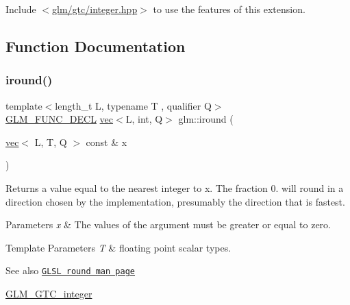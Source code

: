 Include $<$\mbox{\hyperlink{gtc_2integer_8hpp}{glm/gtc/integer.\+hpp}}$>$ to use the features of this extension. 

\subsection{Function Documentation}
\mbox{\label{group__gtc__integer_ga57824268ebe13a922f1d69a5d37f637f}} 
\subsubsection{\texorpdfstring{iround()}{iround()}}
{\footnotesize\ttfamily template$<$length\+\_\+t L, typename T , qualifier Q$>$ \\
\mbox{\hyperlink{setup_8hpp_ab2d052de21a70539923e9bcbf6e83a51}{G\+L\+M\+\_\+\+F\+U\+N\+C\+\_\+\+D\+E\+CL}} \mbox{\hyperlink{structglm_1_1vec}{vec}}$<$L, int, Q$>$ glm\+::iround (\begin{DoxyParamCaption}\item[{\mbox{\hyperlink{structglm_1_1vec}{vec}}$<$ L, T, Q $>$ const \&}]{x }\end{DoxyParamCaption})}

Returns a value equal to the nearest integer to x. The fraction 0. will round in a direction chosen by the implementation, presumably the direction that is fastest.


\begin{DoxyParams}{Parameters}
{\em x} & The values of the argument must be greater or equal to zero. \\
\hline
\end{DoxyParams}

\begin{DoxyTemplParams}{Template Parameters}
{\em T} & floating point scalar types.\\
\hline
\end{DoxyTemplParams}
\begin{DoxySeeAlso}{See also}
\href{http://www.opengl.org/sdk/docs/manglsl/xhtml/round.xml}{\tt G\+L\+SL round man page} 

\mbox{\hyperlink{group__gtc__integer}{G\+L\+M\+\_\+\+G\+T\+C\+\_\+integer}} 
\end{DoxySeeAlso}
\mbox{\label{group__gtc__integer_ga9bd682e74bfacb005c735305207ec417}} 
